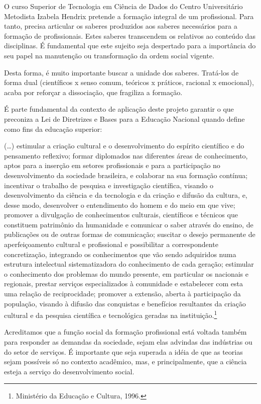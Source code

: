 \documentclass[a4paper, 12pt, openright, oneside, german, french, english, brazil]{abntex2}
\begin{document}
O curso Superior de Tecnologia em Ciência de Dados do Centro Universitário Metodista Izabela Hendrix pretende a formação integral de um profissional. Para tanto, precisa articular os saberes produzidos aos saberes necessários para a formação de profissionais. Estes saberes transcendem os relativos ao conteúdo das disciplinas. É fundamental que este sujeito seja despertado para a importância do seu papel na manutenção ou transformação da ordem social vigente.

Desta forma, é muito importante buscar a unidade dos saberes. Tratá-los de forma dual (científicos x senso comum, teóricos x práticos, racional x emocional), acaba por reforçar a dissociação, que fragiliza a formação.

É parte fundamental da contexto de aplicação deste projeto garantir o que preconiza a Lei de Diretrizes e Bases para a Educação Nacional quando define como fins da educação superior:

\begin{citacao}
  (\dots) estimular a criação cultural e o desenvolvimento do espírito científico e do pensamento reflexivo; formar diplomados nas diferentes áreas de conhecimento, aptos para a inserção em setores profissionais e para a participação no desenvolvimento da sociedade brasileira, e colaborar na sua formação contínua; incentivar o trabalho de pesquisa e investigação científica, visando o desenvolvimento da ciência e da tecnologia e da criação e difusão da cultura, e, desse modo, desenvolver o entendimento do homem e do meio em que vive; promover a divulgação de conhecimentos culturais, científicos e técnicos que constituem patrimônio da humanidade e comunicar o saber através do ensino, de publicações ou de outras formas de comunicação; suscitar o desejo permanente de aperfeiçoamento cultural e profissional e possibilitar a correspondente concretização, integrando os conhecimentos que vão sendo adquiridos numa estrutura intelectual sistematizadora do conhecimento de cada geração; estimular o conhecimento dos problemas do mundo presente, em particular os nacionais e regionais, prestar serviços especializados à comunidade e estabelecer com esta uma relação de reciprocidade; promover a extensão, aberta à participação da população, visando à difusão das conquistas e benefícios resultantes da criação cultural e da pesquisa científica e tecnológica geradas na instituição.\footnote{Ministério da Educação e Cultura, 1996.}
\end{citacao}

Acreditamos que a função social da formação profissional está voltada também para responder as demandas da sociedade, sejam elas advindas das indústrias ou do setor de serviços. É importante que seja superada a idéia de que as teorias sejam possíveis só no contexto acadêmico, mas, e principalmente, que a ciência esteja a serviço do desenvolvimento social.
\end{document}
